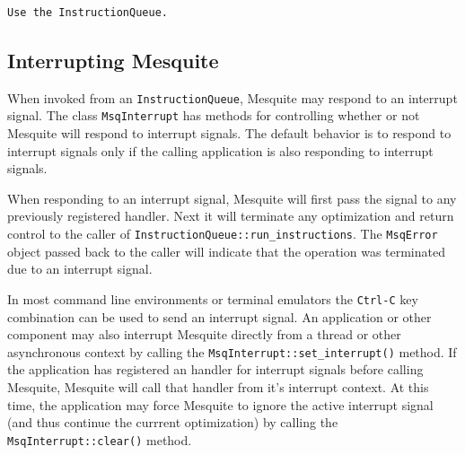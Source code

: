 \begin{verbatim}
Use the InstructionQueue. 
\end{verbatim}

\subsection{Interrupting Mesquite} \label{sec:Ctrl-C}

When invoked from an {\tt InstructionQueue}, Mesquite may respond to 
an interrupt signal.  
The class {\tt MsqInterrupt} has methods for controlling whether or not
Mesquite will respond to interrupt signals.  The default behavior is
to respond to interrupt signals only if the calling application is also
responding to interrupt signals.  

When responding to an interrupt signal,
Mesquite will first pass the signal to any previously
registered handler.  Next it will terminate any optimization and
return control to the caller of {\tt InstructionQueue::run\_instructions}.  
The {\tt MsqError} object 
passed back to the caller will indicate that the operation was terminated
due to an interrupt signal.

In most command line 
environments or terminal emulators the {\tt Ctrl-C} key combination can
be used to send an interrupt signal.  An application or other 
component may also interrupt Mesquite directly from a thread or other
asynchronous context by calling the {\tt MsqInterrupt::set\_interrupt()}
method.  If the application has registered an handler for interrupt 
signals before calling Mesquite, Mesquite will call that handler from
it's interrupt context.  At this time, the application may force Mesquite
to ignore the active interrupt signal (and thus continue the currrent
optimization) by calling the {\tt MsqInterrupt::clear()}
method.





